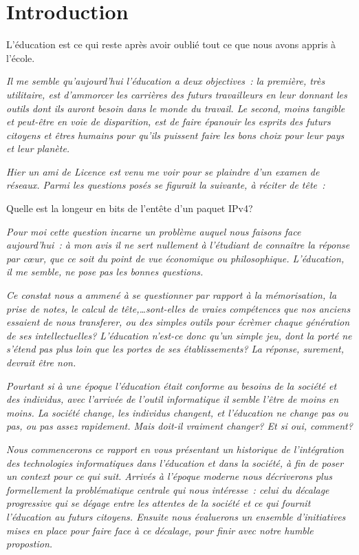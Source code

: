 
\chapter*{Introduction}\label{intro}

\begin{coolquote}
\Large L'éducation est ce qui reste après avoir oublié tout ce que nous avons appris à l'école. 
\end{coolquote}

\textit{Il me semble qu'aujourd'hui l'éducation a deux objectives~: la première, très utilitaire, est d'ammorcer les carrières des futurs travailleurs en leur donnant les outils dont ils auront besoin dans le monde du travail. Le second, moins tangible et peut-être en voie de disparition, est de faire épanouir les esprits des futurs citoyens et êtres humains pour qu'ils puissent faire les bons choix pour leur pays et leur planète.}

\textit{Hier un ami de Licence est venu me voir pour se plaindre d'un examen de réseaux. Parmi les questions posés se figurait la suivante, à réciter de tête~:}

\begin{coolquote}\Large Quelle est la longeur en bits de l'entête d'un paquet IPv4?\end{coolquote}

\textit{Pour moi cette question incarne un problème auquel nous faisons face aujourd'hui~: à mon avis il ne sert nullement à l'étudiant de connaître la réponse par c\oe{}ur, que ce soit du point de vue économique ou philosophique. L'éducation, il me semble, ne pose pas les bonnes questions.}

\textit{Ce constat nous a ammené à se questionner par rapport à la mémorisation, la prise de notes, le calcul de tête,\ldots sont-elles de vraies compétences que nos anciens essaient de nous transferer, ou des simples outils pour écrèmer chaque génération de ses intellectuelles? L'éducation n'est-ce donc qu'un simple jeu, dont la porté ne s'étend pas plus loin que les portes de ses établissements? La réponse, surement, devrait être non.}

\textit{Pourtant si à une époque l'éducation était conforme au besoins de la société et des individus, avec l'arrivée de l'outil informatique il semble l'être de moins en moins. La société change, les individus changent, et l'éducation ne change pas ou pas, ou pas assez rapidement. Mais doit-il vraiment changer? Et si oui, comment?}

\textit{Nous commencerons ce rapport en vous présentant un historique de l'intégration des technologies informatiques dans l'éducation et dans la société, à fin de poser un context pour ce qui suit. Arrivés à l'époque moderne nous décriverons plus formellement la problématique centrale qui nous intéresse~: celui du décalage progressive qui se dégage entre les attentes de la société et ce qui fournit l'éducation au futurs citoyens. Ensuite nous évaluerons un ensemble d'initiatives mises en place pour faire face à ce décalage, pour finir avec notre humble propostion.}